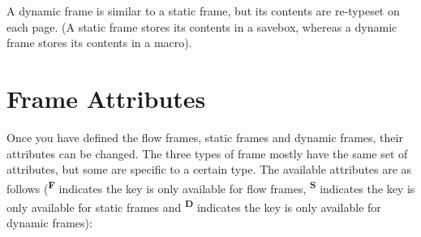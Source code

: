 \documentclass[a0]{a0poster}
\begin{document}
A dynamic frame is similar to a static frame, but its contents
are re-typeset on each page. (A static frame stores its
contents in a savebox, whereas a dynamic frame stores its
contents in a macro).

\section{Frame Attributes}
\label{sec:modattr}

Once you have defined the {flow frames}, {static frames} and
{dynamic frames}, their attributes can be changed.
The three types of frame mostly have the
same set of attributes, but some are specific to a certain type.
The available attributes are as follows
(\textsuperscript{\textbf{F}} indicates the key is
only available for {flow frames},
\textsuperscript{\textbf{S}} indicates the key is only available
for {static frames}
and \textsuperscript{\textbf{D}} indicates the key
is only available for {dynamic frames}):
\end{document}
